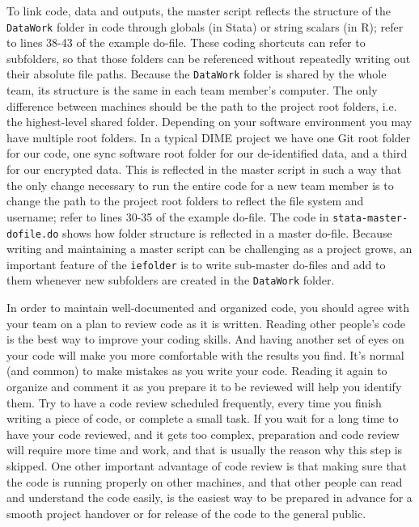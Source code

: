 To link code, data and outputs,
the master script reflects the structure of the \texttt{DataWork} folder in code
through globals (in Stata) or string scalars (in R);
refer to lines 38-43 of the example do-file.
These coding shortcuts can refer to subfolders,
so that those folders can be referenced without repeatedly writing out their absolute file paths.
Because the \texttt{DataWork} folder is shared by the whole team,
its structure is the same in each team member's computer.
The only difference between machines should be
the path to the project root folders, i.e. the highest-level shared folder.
Depending on your software environment you may have multiple root folders.
In a typical DIME project we have one Git root folder for our code,
one sync software root folder for our de-identified data,
and a third for our encrypted data.
This is reflected in the master script in such a way that
the only change necessary to run the entire code for a new team member
is to change the path to the project root folders
to reflect the file system and username;
refer to lines 30-35 of the example do-file.
The code in \texttt{stata-master-dofile.do} shows how folder structure is reflected in a master do-file.
Because writing and maintaining a master script can be challenging as a project grows,
an important feature of the \texttt{iefolder} is to write sub-master do-files
and add to them whenever new subfolders are created in the \texttt{DataWork} folder.

In order to maintain well-documented and organized code,
you should agree with your team on a plan to review code as it is written.
Reading other people's code is the best way to improve your coding skills.
And having another set of eyes on your code will make you more comfortable with the results you find.
It's normal (and common) to make mistakes as you write your code.
Reading it again to organize and comment it as you prepare it to be reviewed will help you identify them.
Try to have a code review scheduled frequently,
every time you finish writing a piece of code, or complete a small task.
If you wait for a long time to have your code reviewed, and it gets too complex,
preparation and code review will require more time and work,
and that is usually the reason why this step is skipped.
One other important advantage of code review is that
making sure that the code is running properly on other machines,
and that other people can read and understand the code easily,
is the easiest way to be prepared in advance for a smooth project handover
or for release of the code to the general public.

